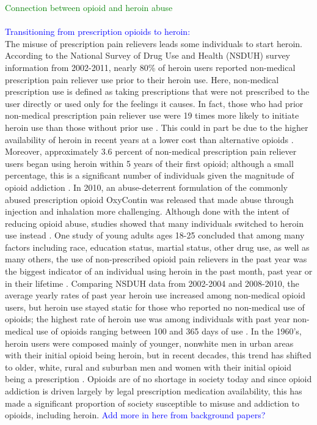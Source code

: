\documentclass[12pt]{article}
\begin{document}
\textcolor{green}{Connection between opioid and heroin abuse} \\ \\
\textcolor{blue}{Transitioning from prescription opioids to heroin:} \\
The misuse of prescription pain relievers leads some individuals to start heroin. According to the National Survey of Drug Use and Health (NSDUH) survey information from 2002-2011, nearly 80\% of heroin users reported non-medical prescription pain reliever use prior to their heroin use. Here, non-medical prescription use is defined as taking prescriptions that were not prescribed to the user directly or used only for the feelings it causes. In fact, those who had prior non-medical prescription pain reliever use were 19 times more likely to initiate heroin use than those without prior use \cite{Muhuri}. This could in part be due to the higher availability of heroin in recent years at a lower cost than alternative opioids \cite{NIDA1}. Moreover, approximately 3.6 percent of non-medical prescription pain reliever users began using heroin within 5 years of their first opioid; although a small percentage, this is a significant number of individuals given the magnitude of opioid addiction \cite{Muhuri}. In 2010, an abuse-deterrent formulation of the commonly abused prescription opioid OxyContin was released that made abuse through injection and inhalation more challenging. Although done with the intent of reducing opioid abuse, studies showed that many individuals switched to heroin use instead \cite{Cicero2, Cicero3}. One study of young adults ages 18-25 concluded that among many factors including race, education status, martial status, other drug use, as well as many others, the use of non-prescribed opioid pain relievers in the past year was the biggest indicator of an individual using heroin in the past month, past year or in their lifetime \cite{Ihongbe}. Comparing NSDUH data from 2002-2004 and 2008-2010, the average yearly rates of past year heroin use increased among non-medical opioid users, but heroin use stayed static for those who reported no non-medical use of opioids; the highest rate of heroin use was among individuals with past year non-medical use of opioids ranging between 100 and 365 days of use \cite{Jones}. In the 1960's, heroin users were composed mainly of younger, nonwhite men in urban areas with their initial opioid being heroin, but in recent decades, this trend has shifted to older, white, rural and suburban men and women with their initial opioid being a prescription \cite{Cicero}. Opioids are of no shortage in society today and since opioid addiction is driven largely by legal prescription medication availability, this has made a significant proportion of society susceptible to misuse and addiction to opioids, including heroin. 
\textcolor{blue}{Add more in here from background papers?}\\ 
\end{document}
